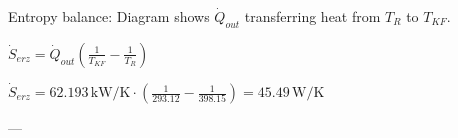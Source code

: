 Entropy balance:  
Diagram shows \( \dot{Q}_{out} \) transferring heat from \( T_R \) to \( T_{KF} \).  

\( \dot{S}_{erz} = \dot{Q}_{out} \left( \frac{1}{T_{KF}} - \frac{1}{T_R} \right) \)  

\( \dot{S}_{erz} = 62.193 \, \text{kW/K} \cdot \left( \frac{1}{293.12} - \frac{1}{398.15} \right) = 45.49 \, \text{W/K} \)  

---